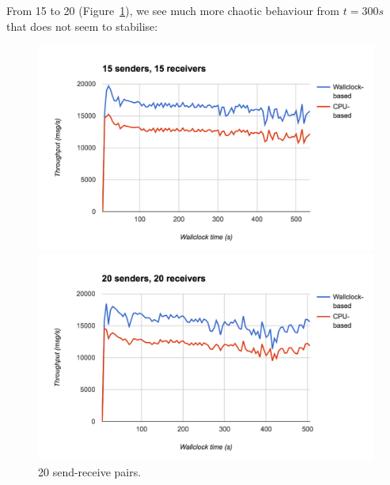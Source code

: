 From 15 to 20 (Figure~\ref{fig:15n20}), we see much more chaotic behaviour from $t=300s$ that does not seem to stabilise:
\begin{figure}
  \centering\includegraphics[width=\textwidth]{../transcripts/lipsum/15n15/15n15.png}

  \centering\includegraphics[width=\textwidth]{../transcripts/lipsum/20n20/20n20.png}
  \caption{20 send-receive pairs.}
  \label{fig:15n20}
\end{figure}


